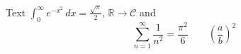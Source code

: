 \documentclass{article}
\begin{document}
Text $\int_0^\infty e^{-x^2}\,dx=\frac{\sqrt\pi}{2}$, $\mathbb{R}\to\mathcal{C}$ and
\[ \sum_{n=1}^{\infty}\frac{1}{n^2}=\frac{\pi^2}{6}\qquad \left(\frac{a}{b}\right)^{\!2} \]
\end{document}
